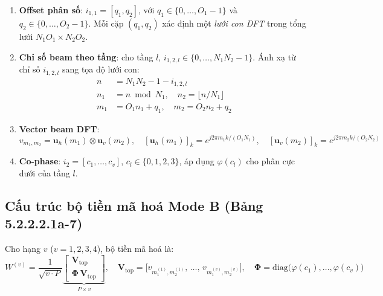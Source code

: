 \documentclass[11pt,a4paper]{article}
\begin{document}
\begin{enumerate}
  \item \textbf{Offset phân số}: $i_{1,1} = [q_1, q_2]$, với
        $q_1 \in \{0,\ldots,O_1{-}1\}$ và $q_2 \in \{0,\ldots,O_2{-}1\}$.
        Mỗi cặp $(q_1, q_2)$ xác định một \emph{lưới con DFT} trong tổng lưới
        $N_1 O_1 \times N_2 O_2$.
  \item \textbf{Chỉ số beam theo tầng}: cho tầng $l$, $i_{1,2,l} \in \{0,\ldots,N_1 N_2{-}1\}$.
        Ánh xạ từ chỉ số $i_{1,2,l}$ sang tọa độ lưới con:
        \begin{align}
          n &= N_1 N_2 - 1 - i_{1,2,l} \label{eq:n_mapping}\\
          n_1 &= n \bmod N_1, \quad n_2 = \lfloor n / N_1 \rfloor \label{eq:n1n2}\\
          m_1 &= O_1 n_1 + q_1, \quad m_2 = O_2 n_2 + q_2 \label{eq:m1m2}
        \end{align}
  \item \textbf{Vector beam DFT}:
        \begin{equation}
          v_{m_1,m_2} = \mathbf{u}_h(m_1) \otimes \mathbf{u}_v(m_2), \quad
          [\mathbf{u}_h(m_1)]_k = e^{j2\pi m_1 k/(O_1 N_1)}, \quad
          [\mathbf{u}_v(m_2)]_k = e^{j2\pi m_2 k/(O_2 N_2)}
          \label{eq:vlm}
        \end{equation}
  \item \textbf{Co-phase}: $i_2 = [c_1,\ldots,c_v]$, $c_l \in \{0,1,2,3\}$,
        áp dụng $\varphi(c_l)$ cho phân cực dưới của tầng $l$.
\end{enumerate}

\subsection{Cấu trúc bộ tiền mã hoá Mode B (Bảng 5.2.2.2.1a-7)}

Cho hạng $v$ ($v = 1,2,3,4$), bộ tiền mã hoá là:
\begin{equation}
  W^{(v)} = \frac{1}{\sqrt{v \cdot P}}
  \underbrace{\begin{bmatrix}
    \mathbf{V}_{\text{top}} \\
    \boldsymbol{\Phi}\,\mathbf{V}_{\text{top}}
  \end{bmatrix}}_{P \times v}, \quad
  \mathbf{V}_{\text{top}} =
  \bigl[v_{m_1^{(1)},m_2^{(1)}},\,\ldots,\,v_{m_1^{(v)},m_2^{(v)}}\bigr],
  \quad
  \boldsymbol{\Phi} = \mathrm{diag}\bigl(\varphi(c_1),\ldots,\varphi(c_v)\bigr)
  \label{eq:W_modeB}
\end{equation}
\end{document}
